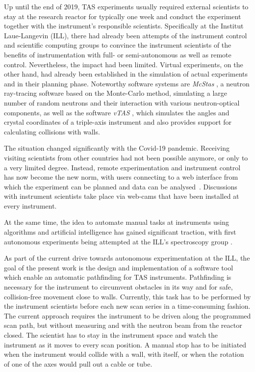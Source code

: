 Up until the end of 2019, TAS experiments usually required external scientists to stay at the research reactor for
typically one week and conduct the experiment together with the instrument's responsible scientists. Specifically
at the Institut Laue-Langevin (ILL), there had already been attempts \cite{Song2020} of the instrument control
and scientific computing groups to convince the instrument scientists of the benefits of instrumentation with full- or
semi-autonomous as well as remote control. Nevertheless, the impact had been limited.
Virtual experiments, on the other hand, had already been established in the simulation of actual experiments and in their
planning phase. Noteworthy software systems are \textit{McStas} \cite{McStas2020, McStas2021}, a neutron ray-tracing software based on the
Monte-Carlo method, simulating a large number of random neutrons and their interaction with various neutron-optical components,
as well as the software \textit{vTAS} \cite{vTAS2013}, which simulates the angles and crystal coordinates of a triple-axis
instrument and also provides support for calculating collisions with walls.

The situation changed significantly with the Covid-19 pandemic. Receiving visiting scientists from other countries had
not been possible anymore, or only to a very limited degree. Instead, remote experimentation and instrument control has
now become the new norm, with users connecting to a web interface from which the experiment can be planned and data can
be analysed~\cite{web_ill_visa}.
Discussions with instrument scientists take place via web-cams that have been installed at every instrument.

At the same time, the idea to automate manual tasks at instruments using algorithms and artificial intelligence has
gained significant traction, with first autonomous experiments being attempted at the ILL's spectroscopy group
\cite{web_ill_autonomous2020, Noack2021}.

As part of the current drive towards autonomous experimentation at the ILL, the goal of the present work is the design
and implementation of a software tool which enable an automatic pathfinding for TAS instruments. Pathfinding
is necessary for the instrument to circumvent obstacles in its way and for safe, collision-free movement close to walls.
Currently, this task has to be performed by the instrument scientists before each new scan series in a time-consuming fashion.
The current approach requires the instrument to be driven along the programmed scan path, but without measuring and with
the neutron beam from the reactor closed.
The scientist has to stay in the instrument space and watch the instrument as it moves to every scan position.
A manual stop has to be initiated when the instrument would collide with a wall, with itself, or when the rotation of one
of the axes would pull out a cable or tube.

